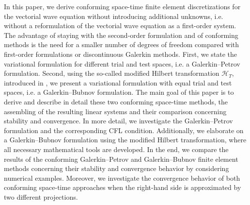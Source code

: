 \documentclass[a4paper,11pt]{article}
\begin{document}
	In this paper, we derive conforming space-time finite element discretizations for the vectorial wave equation without introducing additional unknowns, i.e. without a reformulation of the vectorial wave equation as a first-order system. The advantage of staying with the second-order formulation and of conforming methods is the need for a smaller number of degrees of freedom compared with first-order formulations or discontinuous Galerkin methods. First, we state the variational formulation for different trial and test spaces, i.e. a Galerkin--Petrov formulation. Second, using the so-called modified Hilbert transformation $\mathcal H_T$, introduced in \cite{SteinbachZankETNA2020, ZankDissBuch2020}, we present a variational formulation with equal trial and test spaces, i.e. a Galerkin--Bubnov formulation. The main goal of this paper is to derive and describe in detail these two conforming space-time methods, the assembling of the resulting linear systems and their comparison concerning stability and convergence. In more detail, we investigate the Galerkin--Petrov formulation and the corresponding CFL condition. Additionally, we elaborate on a Galerkin--Bubnov formulation using the modified Hilbert transformation, where all necessary mathematical tools are developed. In the end, we compare the results of the conforming Galerkin--Petrov and Galerkin--Bubnov finite element methods concerning their stability and convergence behavior by considering numerical examples. Moreover, we investigate the convergence behavior of both conforming space-time approaches when the right-hand side is approximated by two different projections.
	
\end{document}
